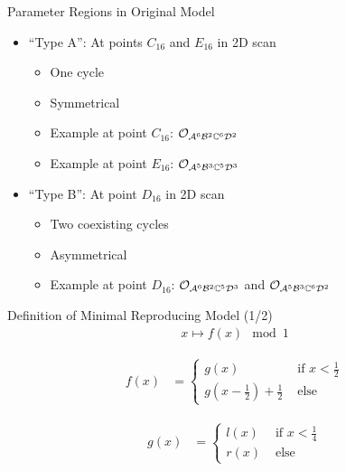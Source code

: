 \begin{frame}{Parameter Regions in Original Model}
    \begin{itemize}
        \item ``Type A'': At points $C_{16}$ and $E_{16}$ in 2D scan
              \begin{itemize}
                  \item One cycle
                  \item Symmetrical
                  \item Example at point $C_{16}$: $\mathcal{O}_{\mathcal{A}^6\mathcal{B}^2\mathbb{C}^6\mathcal{D}^2}$
                  \item Example at point $E_{16}$: $\mathcal{O}_{\mathcal{A}^5\mathcal{B}^3\mathbb{C}^5\mathcal{D}^3}$ \vspace*{1em}
              \end{itemize}
        \item ``Type B'': At point $D_{16}$ in 2D scan
              \begin{itemize}
                  \item Two coexisting cycles
                  \item Asymmetrical
                  \item Example at point $D_{16}$: $\mathcal{O}_{\mathcal{A}^6\mathcal{B}^2\mathbb{C}^5\mathcal{D}^3}$ and $\mathcal{O}_{\mathcal{A}^5\mathcal{B}^3\mathbb{C}^6\mathcal{D}^2}$
              \end{itemize}
    \end{itemize}
\end{frame}

\begin{frame}{Definition of Minimal Reproducing Model (1/2)}
    \vspace{-3.0em}
    \begin{align}
        x \mapsto f(x) \mod 1
    \end{align}

    \begin{align}
        f(x) & = \begin{cases}
                     g(x)                                        & \text{ if } x < \frac{1}{2} \\
                     g\left(x - \frac{1}{2}\right) + \frac{1}{2} & \text{ else}
                 \end{cases}
    \end{align}

    \begin{align}
        g(x) & = \begin{cases}
                     l(x) & \text{ if } x < \frac{1}{4} \\
                     r(x) & \text{ else}
                 \end{cases}
    \end{align}
\end{frame}


